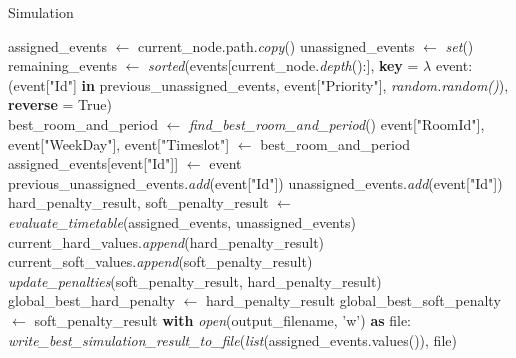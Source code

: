 \begin{algorithm}
\caption{Simulation}\label{simulation}
\begin{algorithmic}[1]
    \State assigned\_events $\gets$ current\_node.path.\textit{copy}()
    \State unassigned\_events $\gets$ \textit{set}()
    \State remaining\_events $\gets$ \textit{sorted}(events[current\_node.\textit{depth}():], 
    \Statex \hspace{3cm} \textbf{key} = $\lambda$ event: (event["Id"] \textbf{in} previous\_unassigned\_events, event["Priority"], \textit{random.random()}), 
    \Statex \hspace{3cm} \textbf{reverse} = True)
    \\
        \State best\_room\_and\_period $\gets$ \textit{find\_best\_room\_and\_period}()
            \State event["RoomId"], event["WeekDay"], event["Timeslot"] $\gets$ best\_room\_and\_period
            \State assigned\_events[event["Id"]] $\gets$ event
        \Else
            \State previous\_unassigned\_events.\textit{add}(event["Id"])
            \State unassigned\_events.\textit{add}(event["Id"])
        \EndIf
    \EndFor
    \\
    \State hard\_penalty\_result, soft\_penalty\_result $\gets$ \textit{evaluate\_timetable}(assigned\_events, unassigned\_events)
    \\
    \State current\_hard\_values.\textit{append}(hard\_penalty\_result)
    \State current\_soft\_values.\textit{append}(soft\_penalty\_result)
    \\
    \State \textit{update\_penalties}(soft\_penalty\_result, hard\_penalty\_result)
    \\
        \State global\_best\_hard\_penalty $\gets$ hard\_penalty\_result
        \State global\_best\_soft\_penalty $\gets$ soft\_penalty\_result
        \State \textbf{with} \textit{open}(output\_filename, 'w') \textbf{as} file:
            \State \hspace{1cm} \textit{write\_best\_simulation\_result\_to\_file}(\textit{list}(assigned\_events.values()), file)

\end{algorithmic}
\end{algorithm}
